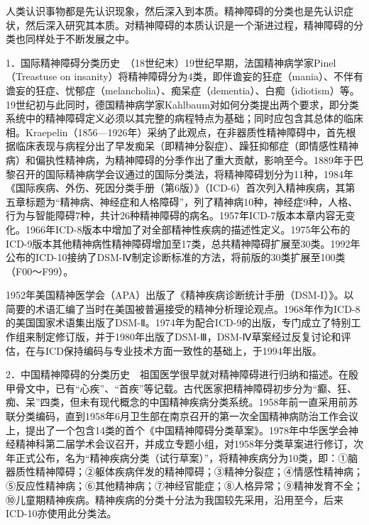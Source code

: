 人类认识事物都是先认识现象，然后深入到本质。精神障碍的分类也是先认识症状，然后深入研究其本质。对精神障碍的本质认识是一个渐进过程，精神障碍的分类也同样处于不断发展之中。

1．国际精神障碍分类历史　（18世纪末）19世纪早期，法国精神病学家Pinel（Treastuse
on
insanity）将精神障碍分为4类，即伴谵妄的狂症（mania）、不伴有谵妄的狂症、忧郁症（melancholia）、痴呆症（dementia）、白痴（idiotism）等。19世纪初与此同时，德国精神病学家Kahlbaum对如何分类提出两个要求，即分类系统中的精神障碍定义必须以其完整的病程特点为基础；同时应包含其总体的临床相。Kraepelin（1856---1926年）采纳了此观点，在非器质性精神障碍中，首先根据临床表现与病程分出了早发痴呆（即精神分裂症）、躁狂抑郁症（即情感性精神病）和偏执性精神病，为精神障碍的分季作出了重大贡献，影响至今。1889年于巴黎召开的国际精神病学会议通过的国际分类法，将精神障碍划分为11种，1984年《国际疾病、外伤、死因分类手册（第6版）》（ICD-6）首次列入精神疾病，其第五章标题为“精神病、神经症和人格障碍”，列了精神病10种，神经症9种，人格、行为与智能障碍7种，共计26种精神障碍的病名。1957年ICD-7版本本章内容无变化。1966年ICD-8版本中增加了对全部精神性疾病的描述性定义。1975年公布的ICD-9版本其他精神病性精神障碍增加至17类，总共精神障碍扩展至30类。1992年公布的ICD-10接纳了DSM-Ⅳ制定诊断标准的方法，将前版的30类扩展至100类（F00～F99）。

1952年美国精神医学会（APA）出版了《精神疾病诊断统计手册（DSM-I）》。以简要的术语汇编了当时在美国被普遍接受的精神分析理论观点。1968年作为ICD-8的美国国家术语集出版了DSM-Ⅱ。1974年为配合ICD-9的出版，专门成立了特别工作组来制定修订版，并于1980年出版了DSM-Ⅲ，DSM-Ⅳ草案经过反复讨论和评估，在与ICD保持编码与专业技术方面一致性的基础上，于1994年出版。

2．中国精神障碍的分类历史　祖国医学很早就对精神障碍进行归纳和描述。在殷甲骨文中，已有“心疾”、“首疾”等记载。古代医家把精神障碍初步分为“癫、狂、痴、呆”四类，但未有现代概念的中国精神疾病分类系统。1958年前一直采用前苏联分类编码，直到1958年6月卫生部在南京召开的第一次全国精神病防治工作会议上，提出了一个包含14类的首个《中国精神障碍分类草案》。1978年中华医学会神经精神科第二届学术会议召开，并成立专题小组，对1958年分类草案进行修订，次年正式公布，名为“精神疾病分类（试行草案）”，将精神疾病分为10类，即：①脑器质性精神障碍；②躯体疾病伴发的精神障碍；③精神分裂症；④情感性精神病；⑤反应性精神病；⑥其他精神病；⑦神经官能症；⑧人格异常；⑨精神发育不全；⑩儿童期精神疾病。精神疾病的分类十分法为我国较先采用，沿用至今，后来ICD-10亦使用此分类法。

